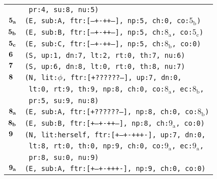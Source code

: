 \documentclass{article}
\begin{document}
\begin{minipage}{\textwidth}
{\begin{tabular}{|r|l|}
    & \texttt{\texttt{~pr:4,~su:8,~nu:5)}} \\
    ${\textbf{\textrm{5}}_{\textbf{\textrm{a}}}}$ & \texttt{\texttt{(E,~sub:A,~ftr:[---+-++--],~np:5,~ch:0,~co:${\textrm{5}_{\textrm{b}}}$)}} \\
    ${\textbf{\textrm{5}}_{\textbf{\textrm{b}}}}$ & \texttt{\texttt{(E,~sub:B,~ftr:[---+-++--],~np:5,~ch:${\textrm{8}_{\textrm{a}}}$,~co:${\textrm{5}_{\textrm{c}}}$)}} \\
    ${\textbf{\textrm{5}}_{\textbf{\textrm{c}}}}$ & \texttt{\texttt{(E,~sub:C,~ftr:[---+-++--],~np:5,~ch:${\textrm{8}_{\textrm{b}}}$,~co:0)}} \\
    ${\textbf{\textrm{6}}_{\phantom{z}}}$ & \texttt{\texttt{(S,~up:1,~dn:7,~lt:2,~rt:0,~th:7,~nu:6)}} \\
    ${\textbf{\textrm{7}}_{\phantom{z}}}$ & \texttt{\texttt{(S,~up:6,~dn:8,~lt:0,~rt:0,~th:8,~nu:7)}} \\
    ${\textbf{\textrm{8}}_{\phantom{z}}}$ & \texttt{\texttt{(N,~lit:$\phi$,~ftr:[+??????--],~up:7,~dn:0,}} \\
    & \texttt{\texttt{~lt:0,~rt:9,~th:9,~np:8,~ch:0,~co:${\textrm{8}_{\textrm{a}}}$,~ec:${\textrm{8}_{\textrm{b}}}$,}} \\
    & \texttt{\texttt{~pr:5,~su:9,~nu:8)}} \\
    ${\textbf{\textrm{8}}_{\textbf{\textrm{a}}}}$ & \texttt{\texttt{(E,~sub:A,~ftr:[+??????--],~np:8,~ch:0,~co:${\textrm{8}_{\textrm{b}}}$)}} \\
    ${\textbf{\textrm{8}}_{\textbf{\textrm{b}}}}$ & \texttt{\texttt{(E,~sub:B,~ftr:[+--+-++--],~np:8,~ch:${\textrm{9}_{\textrm{a}}}$,~co:0)}} \\
    ${\textbf{\textrm{9}}_{\phantom{z}}}$ & \texttt{\texttt{(N,~lit:herself,~ftr:[+--+-+++-],~up:7,~dn:0,}} \\
    & \texttt{\texttt{~lt:8,~rt:0,~th:0,~np:9,~ch:0,~co:${\textrm{9}_{\textrm{a}}}$,~ec:${\textrm{9}_{\textrm{a}}}$,}} \\
    & \texttt{\texttt{~pr:8,~su:0,~nu:9)}} \\
    ${\textbf{\textrm{9}}_{\textbf{\textrm{a}}}}$ & \texttt{\texttt{(E,~sub:A,~ftr:[+--+-+++-],~np:9,~ch:0,~co:0)}} \\
    \hline
  \end{tabular}
  }
\end{minipage}
\bigbreak

\clearpage

%
%
\end{document}
